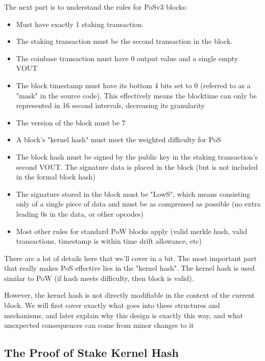 The next part is to understand the rules for PoSv3 blocks:
\begin{itemize}
	\item Must have exactly 1 staking transaction.
	\item The staking transaction must be the second transaction in the block.
	\item The coinbase transaction must have 0 output value and a single empty VOUT
	\item The block timestamp must have its bottom 4 bits set to 0 (referred
	to as a "mask" in the source code). This effectively means the blocktime
	can only be represented in 16 second intervals, decreasing its granularity
	\item The version of the block must be 7
	\item A block's "kernel hash" must meet the weighted difficulty for PoS
	\item The block hash must be signed by the public key in the staking
	transaction's second VOUT. The signature data is placed in the block
	(but is not included in the formal block hash)
	\item The signature stored in the block must be "LowS", which means
	consisting only of a single piece of data and must be as compressed
	as possible (no extra leading 0s in the data, or other opcodes)
	\item Most other rules for standard PoW blocks apply (valid merkle
	hash, valid transactions, timestamp is within time drift allowance, etc)
\end{itemize}



There are a lot of details here that we'll cover in a bit. The most important
part that really makes PoS effective lies in the "kernel hash". The kernel
hash is used similar to PoW (if hash meets difficulty, then block is valid).



However, the kernel hash is not directly modifiable in the context of the
current block. We will first cover exactly what goes into these structures
and mechanisms, and later explain why this design is exactly this way, and
what unexpected consequences can come from minor changes to it



\subsection{The Proof of Stake Kernel Hash}


